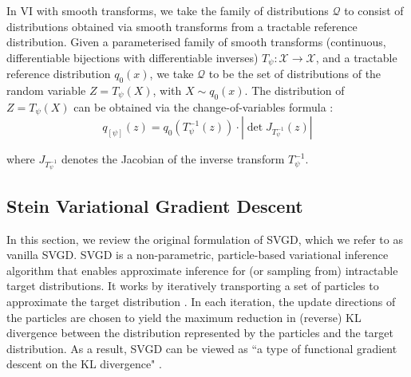 In VI with smooth transforms, we take the family of distributions $\mathcal{Q}$ to consist of distributions obtained via smooth transforms from a tractable reference distribution. Given a parameterised family of smooth transforms (continuous, differentiable bijections with differentiable inverses) $T_{\psi}: \mathcal{X} \rightarrow \mathcal{X}$, and a tractable reference distribution $q_0(x)$, we take $\mathcal{Q}$ to be the set of distributions of the random variable $Z = T_{\psi}(X)$, with $X \sim q_0(x)$. The distribution of $Z = T_{\psi}(X)$ can be obtained via the change-of-variables formula \citep[e.g.,][]{papamak_vi}:
\renewcommand{\theequation}{2.18}
\begin{equation}
q_{[\psi]}(z) = q_0(T_{\psi}^{-1}(z)) \cdot |\det J_{T_{\psi}^{-1}}(z)|
\end{equation}

where $J_{T_{\psi}^{-1}}$ denotes the Jacobian of the inverse transform $T_{\psi}^{-1}$.

\subsection{Stein Variational Gradient Descent}

In this section, we review the original formulation of SVGD, which we refer to as vanilla SVGD.
SVGD \citep{liu_svgd} is a non-parametric, particle-based variational inference algorithm that enables approximate inference for (or sampling from) intractable target distributions. It works by iteratively transporting a set of particles to approximate the target distribution \citep{liu_svgd, liu_svgd_gf}. In each iteration, the update directions of the particles are chosen to yield the maximum reduction in (reverse) KL divergence between the distribution represented by the particles and the target distribution. As a result, SVGD can be viewed as ``a type of functional gradient descent on the KL divergence" \citep{han_gf_svgd}. 

